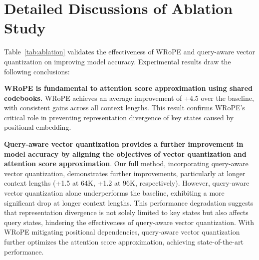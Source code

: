 \begin{table}[ht!]
    \caption{Configurations of KV cache reduction methods.}
    \label{tab:configs}
\end{table}

\section{Detailed Discussions of Ablation Study}

\label{appendix:ablation}

Table~\ref{tab:ablation} validates the effectiveness of WRoPE and query-aware vector quantization
on improving model accuracy.
Experimental results draw the following conclusions: 

\noindent \textbf{WRoPE is fundamental to attention score approximation using shared codebooks.}
WRoPE achieves an average improvement of +4.5 over the baseline, with consistent gains across all context lengths.
This result confirms WRoPE's critical role in preventing representation divergence of key states caused by positional embedding.

\noindent \textbf{Query-aware vector quantization provides a further improvement in model accuracy by aligning the objectives of vector quantization and attention score approximation}.
Our full method, incorporating query-aware vector quantization, demonstrates further improvements, particularly at longer context lengths (+1.5 at 64K, +1.2 at 96K, respectively).
However, query-aware vector quantization alone underperforms the baseline,
exhibiting a more significant drop at longer context lengths.
This performance degradation suggests that representation divergence is not solely limited to key states but also affects query states, hindering the effectiveness of query-aware vector quantization.
With WRoPE mitigating positional dependencies, query-aware vector quantization further optimizes the attention score approximation, achieving state-of-the-art performance.
